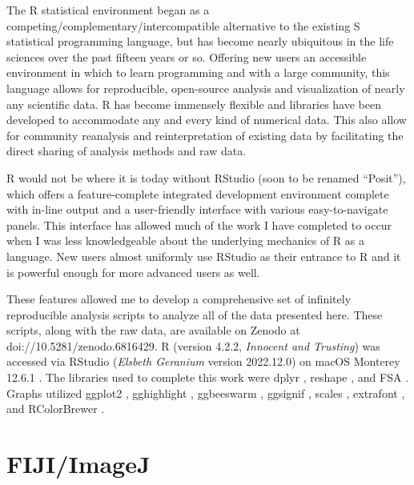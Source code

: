 The R statistical environment began as a competing/complementary/intercompatible alternative to the existing S statistical programming language, but has become nearly ubiquitous in the life sciences over the past fifteen years or so. Offering new users an accessible environment in which to learn programming and with a large community, this language allows for reproducible, open\hyp{}source analysis and visualization of nearly any scientific data. R has become immensely flexible and libraries have been developed to accommodate any and every kind of numerical data. This also allow for community reanalysis and reinterpretation of existing data by facilitating the direct sharing of analysis methods and raw data. 

R would not be where it is today without RStudio (soon to be renamed ``Posit''), which offers a feature\hyp{}complete integrated development environment complete with in\hyp{}line output and a user\hyp{}friendly interface with various easy\hyp{}to\hyp{}navigate panels. This interface has allowed much of the work I have completed to occur when I was less knowledgeable about the underlying mechanics of R as a language. New users almost uniformly use RStudio as their entrance to R and it is powerful enough for more advanced users as well.

These features allowed me to develop a comprehensive set of infinitely reproducible analysis scripts to analyze all of the data presented here. These scripts, along with the raw data, are available on Zenodo at doi://10.5281/zenodo.6816429. R (version 4.2.2, \textit{Innocent and Trusting}) was accessed via RStudio (\textit{Elsbeth Geranium} version 2022.12.0) on macOS Monterey 12.6.1 \citep{RCoreTeam2022, RStudioTeam2022}. The libraries used to complete this work were dplyr \citep{Wickham2022d}, reshape \citep{Wickham2022a}, and FSA \citep{Ogle2022}. Graphs utilized ggplot2 \citep{Wickham2009, Wickham2016, Wickham2022b}, gghighlight \citep{Yutani2022}, ggbeeswarm \citep{Clarke2017}, ggsignif \citep{AhlmannEltze2021}, scales \citep{Wickham2022c}, extrafont \citep{Chang2022}, and RColorBrewer \citep{Neuwirth2022}.

\section{FIJI/ImageJ}\label{imagej}

